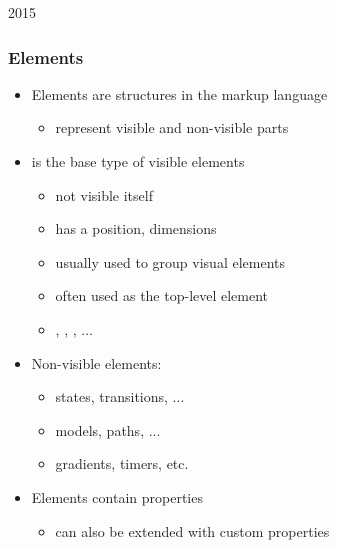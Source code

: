 \begin{slide}{2015}\frametitle{Elements}

\begin{itemize}
\item Elements are structures in the markup language
  \begin{itemize}
  \item represent visible and non-visible parts
  \end{itemize}
\item {} is the base type of visible elements
  \begin{itemize}
  \item not visible itself
  \item has a position, dimensions
  \item usually used to group visual elements
  \item often used as the top-level element
  \item {}, , , ...
  \end{itemize}
\item Non-visible elements:
  \begin{itemize}
  \item states, transitions, ...
  \item models, paths, ...
  \item gradients, timers, etc.
  \end{itemize}
\item Elements contain properties
  \begin{itemize}
  \item can also be extended with custom properties
  \end{itemize}
\end{itemize}



\end{slide}


